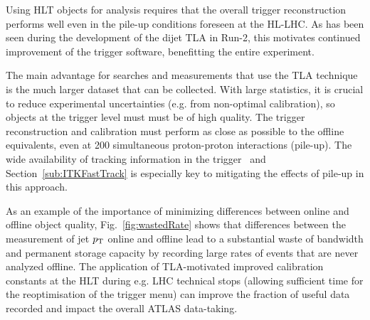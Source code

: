

Using HLT objects for analysis requires that the overall trigger reconstruction performs well even in the pile-up conditions foreseen at the HL-LHC. 
As has been seen during the development of the dijet TLA in Run-2, this motivates continued improvement of the trigger software, benefitting the entire experiment.

The main advantage for searches and measurements that use the TLA technique is the much larger dataset that can be collected. 
With large statistics, it is crucial to reduce experimental uncertainties (e.g. from non-optimal calibration), so objects at the trigger level must must be of high quality. The trigger reconstruction and calibration must perform as close as possible to the offline equivalents, even at 200 simultaneous proton-proton interactions (pile-up).%
The wide availability of tracking information in the trigger~\cite{TDAQ baseline HTT} and Section~\ref{sub:ITKFastTrack} is especially key to mitigating the effects of pile-up in this approach.

As an example of the importance of minimizing differences between online and offline object quality, Fig.~\ref{fig:wastedRate} shows that differences between the measurement of jet $p_{\rm{T}}$ online and offline lead to a substantial waste of bandwidth and permanent storage capacity by recording large rates of events that are never analyzed offline.
The application of TLA-motivated improved calibration constants at the HLT during e.g. LHC technical stops (allowing sufficient time for the reoptimisation of the trigger menu) can improve the fraction of useful data recorded and impact the overall ATLAS data-taking. 

